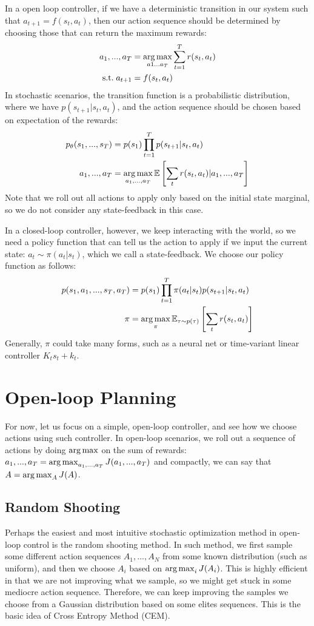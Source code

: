 In a open loop controller, if we have a deterministic transition in our system such that $a_{t+1} = f(s_t,a_t)$, then our action sequence should be determined by choosing those that can return the maximum rewards:
\begin{align*}
    a_1, ..., a_T&=\operatorname*{arg\,max}_{a1...a_T}\sum_{t=1}^Tr(s_t,a_t)\\
    \mathrm{s.t. }\;a_{t+1} &= f(s_t,a_t)
\end{align*}
In stochastic scenarios, the transition function is a probabilistic distribution, where we have $p(s_{t+1}|s_t,a_t)$, and the action sequence should be chosen based on expectation of the rewards:
\begin{align*}
    p_\theta(s_1,...,s_T)&=p(s_1)\prod_{t=1}^Tp(s_{t+1}|s_t,a_t)\\
    a_1,...,a_T &= \operatorname*{arg\,max}_{a_1,...,a_T}\mathbb{E}\left[\sum_t r(s_t,a_t)|a_1,...,a_T\right]
\end{align*}
Note that we roll out all actions to apply only based on the initial state marginal, so we do not consider any state-feedback in this case.

In a closed-loop controller, however, we keep interacting with the world, so we need a policy function that can tell us the action to apply if we input the current state: $a_t\sim \pi(a_t|s_t)$, which we call a state-feedback. We choose our policy function as follows:
\begin{align*}
    p(s_1,a_1,...,s_T,a_T) &= p(s_1)\prod_{t=1}^T\pi(a_t|s_t)p(s_{t+1}|s_t,a_t)\\
    \pi &=\operatorname*{arg\,max}_\pi \mathbb{E}_{\tau\sim p(\tau)}\left[\sum_t r(s_t,a_t)\right]
\end{align*}
Generally, $\pi$ could take many forms, such as a neural net or time-variant linear controller $K_ts_t + k_t$.

\section{Open-loop Planning}
For now, let us focus on a simple, open-loop controller, and see how we choose actions using such controller. In open-loop scenarios, we roll out a sequence of actions by doing $\operatorname*{arg\,max}$ on the sum of rewards:
$a_1,...,a_T = \operatorname*{arg\,max}_{a_1,...,a_T}J(a_1,...,a_T)$
and compactly, we can say that $A = \operatorname*{arg\,max}_A J(A)$.
\subsection{Random Shooting}
Perhaps the easiest and most intuitive stochastic optimization method in open-loop control is the random shooting method. In such method, we first sample some different action sequences $A_1,...,A_N$ from some known distribution (such as uniform), and then we choose $A_i$ based on $\operatorname*{arg\,max}_i J(A_i)$. This is highly efficient in that we are not improving what we sample, so we might get stuck in some mediocre action sequence. Therefore, we can keep improving the samples we choose from a Gaussian distribution based on some elites sequences. This is the basic idea of Cross Entropy Method (CEM).

